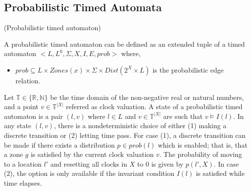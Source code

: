 \subsection{Probabilistic Timed Automata}

\begin{definition}{(Probabilistic timed automaton)} \theoremstyle{definition} \cite{probabilisticTimedAutomata} 
	A probabilistic timed automaton can be defined as an extended tuple of a timed automaton $< L , L^{0}, \Sigma ,X, I, E, prob>$ where, 
	\begin{itemize}
		\item[] $prob \subseteq L \times Zones(x) \times \Sigma \times Dist(2^{X} \times L)$  is the probabilistic edge relation. 
	\end{itemize}
	Let $\mathbb{T} \in \{ \mathbb{R}, \mathbb{N} \}$ be the time domain of the non-negative real or natural numbers, and a point $v \in \mathbb{T}^{|X|}$ referred as clock valuation. 
	A state of a probabilistic timed automaton is a pair $(l,v)$ where $l \in L$ and $v \in \mathbb{T}^{|X|}$  are such that $v \models I(l)$. In any state $(l,v)$, there is a nondeterministic choice of either (1) making a discrete transition or (2) letting time pass. For case (1), a discrete transition can be made if there exists a distribution $p \in prob(l)$ which is enabled; that is, that a zone $g$ is satisfied by the current clock valuation $v$. The probability of moving to a location $l'$ and resetting all clocks in $X$ to 0 is given by $p(l', X)$. In case (2), the option is only available if the invariant condition $I(l)$ is satisfied while time elapses.   
\end{definition}

